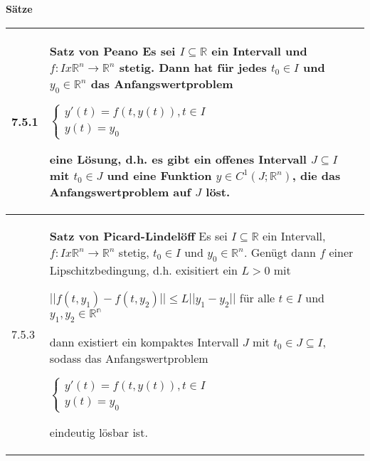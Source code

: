     \noindent 
    \textbf{Sätze}
    \begin{table}[H]
    \begin{tabularx}{\textwidth}{X m{16cm}}
        \toprule

        7.5.1 & \textbf{Satz von Peano} \hfill \break
                Es sei $I \subseteq \mathbb{R}$ ein Intervall und $f: I x \mathbb{R}^n \rightarrow \mathbb{R}^n$ stetig. Dann hat
                für jedes $t_0 \in I$ und $y_0 \in \mathbb{R}^n$ das Anfangswertproblem \hfill \break
                \centerline{$   \begin{cases}
                                y'(t) = f(t,y(t)), t\in I \\
                                y(t) = y_0 
                                \end{cases} $} 
                eine Lösung, d.h. es gibt ein offenes Intervall $J \subseteq I$ mit $t_0 \in J$ und eine Funktion $y \in C^1(J;\mathbb{R}^n)$, 
                die das Anfangswertproblem auf $J$ löst. \\
        \midrule
        7.5.3 & \textbf{Satz von Picard-Lindelöff} \hfill \break
                Es sei $I \subseteq \mathbb{R}$ ein Intervall, $f: I x \mathbb{R}^n \rightarrow \mathbb{R}^n$ stetig, $t_0 \in I$ und 
                $y_0 \in \mathbb{R}^n$. Genügt dann $f$ einer Lipschitzbedingung, d.h. exisitiert ein $L > 0$ mit \hfill \break
                \centerline{$ ||f(t,y_1) -f(t,y_2)|| \leq L||y_1 - y_2||$ für alle $t\in I$ und $y_1,y_2 \in \mathbb{R^n} $}
                dann existiert ein kompaktes Intervall $J$ mit $t_0 \in J \subseteq I$, sodass das Anfangswertproblem \hfill \break
                \centerline{$   \begin{cases}
                                y'(t) = f(t,y(t)), t\in I \\
                                y(t) = y_0 
                                \end{cases} $}
                eindeutig lösbar ist. \\
        \bottomrule
    \end{tabularx}
    \end{table}

